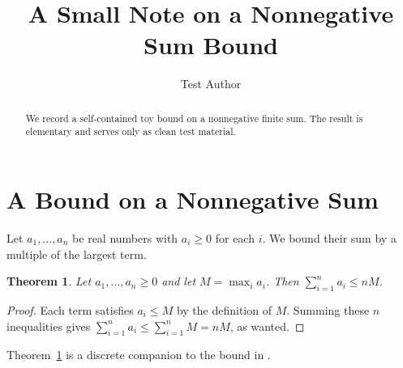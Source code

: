 \documentclass{article}
\newtheorem{theorem}{Theorem}
\begin{document}
\title{A Small Note on a Nonnegative Sum Bound}
\author{Test Author}
\maketitle

\begin{abstract}
We record a self-contained toy bound on a nonnegative finite sum. The result
is elementary and serves only as clean test material.
\end{abstract}

\section{A Bound on a Nonnegative Sum}
Let $a_1, \dots, a_n$ be real numbers with $a_i \ge 0$ for each $i$. We bound
their sum by a multiple of the largest term.

\begin{theorem}
\label{thm:sumbound}
Let $a_1, \dots, a_n \ge 0$ and let $M = \max_i a_i$. Then
$\sum_{i=1}^{n} a_i \le n M$.
\end{theorem}

\begin{proof}
Each term satisfies $a_i \le M$ by the definition of $M$. Summing these $n$
inequalities gives $\sum_{i=1}^{n} a_i \le \sum_{i=1}^{n} M = n M$, as wanted.
\end{proof}

Theorem~\ref{thm:sumbound} is a discrete companion to the bound in
\cite{knuth1997}.
\end{document}
